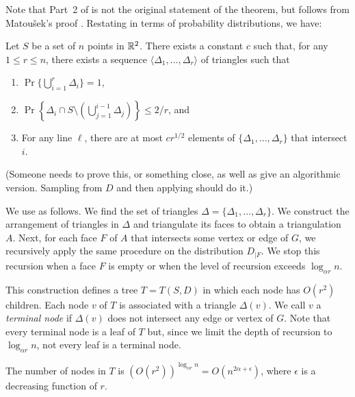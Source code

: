 \documentclass{patmorin}
\begin{document}
Note that Part~2 of  is not the original
statement of the theorem, but follows from Matou\v{s}ek's proof \cite{m91}.
Restating  in terms of probability distributions,
we have:

\begin{thm}
Let $S$ be a set of $n$ points in $\mathbb{R}^2$. There exists a constant
$c$ such that, for any $1\le r \le n$, there exists a sequence
$\langle \Delta_1,\ldots,\Delta_r\rangle$ of triangles such that
  \begin{enumerate}
    \item $\Pr\{\bigcup_{i=1}^r \Delta_i\} = 1$,
  
    \item $\Pr\left\{\Delta_i \cap S\setminus
    \left(\bigcup_{j=1}^{i-1}\Delta_j\right)\right\} \le 2/r$, and
  
    \item For any line $\ell$, there are at most $cr^{1/2}$ elements of
    $\{\Delta_1,\ldots,\Delta_r\}$ that intersect $i$.
  \end{enumerate}
\end{thm}

(Someone needs to prove this, or something close, as well as give an
algorithmic version.  Sampling from $D$ and then applying
 should do it.)

We use  as follows.  We find the set of
triangles $\Delta=\{\Delta_1,\ldots,\Delta_r\}$.  We construct the
arrangement of triangles in $\Delta$ and triangulate its faces to obtain
a triangulation $A$.  Next, for each face $F$ of $A$ that intersects
some vertex or edge of $G$, we recursively apply the same procedure
on the distribution $D_{|F}$.  We stop this recursion when a face $F$
is empty or when the level of recursion exceeds $\log_{\alpha r} n$.

This construction defines a tree $T=T(S,D)$ in which each node has
$O(r^2)$ children.  Each node $v$ of $T$ is associated with a triangle
$\Delta(v)$.  We call $v$ a \emph{terminal node} if $\Delta(v)$ does not
intersect any edge or vertex of $G$.  Note that every terminal node is a
leaf of $T$ but, since we limit the depth of recursion to $\log_{\alpha r}
n$, not every leaf is a terminal node.

The number of nodes in $T$ is $(O(r^2))^{\log_{\alpha r} n} =
O(n^{2\alpha+\epsilon})$, where $\epsilon$ is a decreasing function of $r$.




\end{document}
